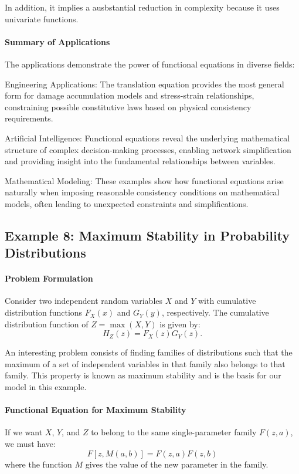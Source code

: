 In addition, it implies a ausbstantial reduction in complexity because it uses univariate functions.

\paragraph{Summary of Applications}
The applications demonstrate the power of functional equations in diverse fields:

Engineering Applications: The translation equation provides the most general form for damage accumulation models and stress-strain relationships, constraining possible constitutive laws based on physical consistency requirements.

Artificial Intelligence: Functional equations reveal the underlying mathematical structure of complex decision-making processes, enabling network simplification and providing insight into the fundamental relationships between variables.

Mathematical Modeling: These examples show how functional equations arise naturally when imposing reasonable consistency conditions on mathematical models, often leading to unexpected constraints and simplifications.

\subsection{Example 8: Maximum Stability in Probability Distributions}
\paragraph{Problem Formulation}
Consider two independent random variables $X$ and $Y$ with cumulative distribution functions $F_X(x)$ and $G_Y(y)$, respectively. The cumulative distribution function of $Z = \max(X, Y)$ is given by:
\begin{equation}
H_Z(z) = F_X(z)G_Y(z).
\end{equation}

An interesting problem consists of finding families of distributions such that the maximum of a set of independent variables in that family also belongs to that family. This property is known as maximum stability and is the basis for our model in this example.

\paragraph{Functional Equation for Maximum Stability}
If we want $X$, $Y$, and $Z$ to belong to the same single-parameter family $F(z, a)$, we must have:
$$F[z, M(a, b)] = F(z, a)F(z, b)$$
where the function $M$ gives the value of the new parameter in the family.

